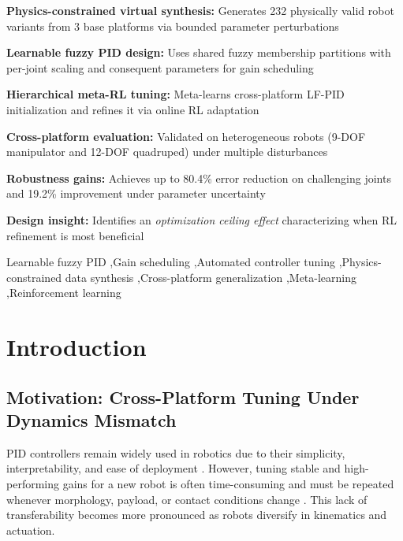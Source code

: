 \documentclass[a4paper]{cas-sc}
\begin{document}
\begin{highlights}
\item \textbf{Physics-constrained virtual synthesis:} Generates 232 physically valid robot variants from 3 base platforms via bounded parameter perturbations
\item \textbf{Learnable fuzzy PID design:} Uses shared fuzzy membership partitions with per-joint scaling and consequent parameters for gain scheduling
\item \textbf{Hierarchical meta-RL tuning:} Meta-learns cross-platform LF-PID initialization and refines it via online RL adaptation
\item \textbf{Cross-platform evaluation:} Validated on heterogeneous robots (9-DOF manipulator and 12-DOF quadruped) under multiple disturbances
\item \textbf{Robustness gains:} Achieves up to 80.4\% error reduction on challenging joints and 19.2\% improvement under parameter uncertainty
\item \textbf{Design insight:} Identifies an \textit{optimization ceiling effect} characterizing when RL refinement is most beneficial
\end{highlights}

\begin{keywords}
Learnable fuzzy PID \sep Gain scheduling \sep Automated controller tuning \sep Physics-constrained data synthesis \sep Cross-platform generalization \sep Meta-learning \sep Reinforcement learning
\end{keywords}

\maketitle

\section{Introduction}
\label{sec:intro}

\subsection{Motivation: Cross-Platform Tuning Under Dynamics Mismatch}

PID controllers remain widely used in robotics due to their simplicity, interpretability, and ease of deployment \cite{astrom2006advanced}. However, tuning stable and high-performing gains for a new robot is often time-consuming and must be repeated whenever morphology, payload, or contact conditions change \cite{vilanova2012pid,johnson2021industrial}. This lack of transferability becomes more pronounced as robots diversify in kinematics and actuation.
\end{document}
